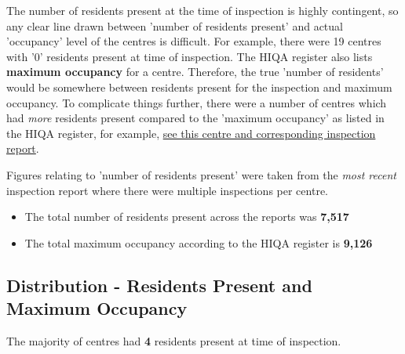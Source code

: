 \documentclass[a4paper,11pt,twoside]{article}
\begin{document}
The number of residents present at the time of inspection is highly contingent, so any clear line drawn between 'number of residents present' and actual 'occupancy' level of the centres is difficult. For example, there were 19 centres with '0' residents present at time of inspection. The HIQA register also lists \textbf{maximum occupancy} for a centre. Therefore, the true 'number of residents' would be somewhere between residents present for the inspection and maximum occupancy. To complicate things further, there were a number of centres which had \emph{more} residents present compared to the 'maximum occupancy' as listed in the HIQA register, for example, \href{https://www.hiqa.ie/areas-we-work/find-a-centre/grove-1}{see this centre and corresponding inspection report}.

Figures relating to 'number of residents present' were taken from the \emph{most recent} inspection report where there were multiple inspections per centre.
\begin{itemize}
\item The total number of residents present across the reports was \textbf{7,517}
\item The total maximum occupancy according to the HIQA register is \textbf{9,126}
\end{itemize}
\subsection{Distribution - Residents Present and Maximum Occupancy}
\label{sec:org7dee06e}
The majority of centres had \textbf{4} residents present at time of inspection.
\end{document}
